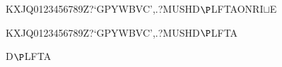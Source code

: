 \documentclass[12pt]{article}
\begin{document}
\begin{tt}
\begin{small}
\begin{bundle}{}
{\begin{bundle}{KXJQ0123456789Z?`GPYWBVC',.?MUSHD$\P$LFTAONRI$\sqcup$E}
{\begin{bundle}{KXJQ0123456789Z?`GPYWBVC',.?MUSHD$\P$LFTA}
{\begin{bundle}{D$\P$LFTA}
\end{bundle}}
\end{bundle}}
\end{bundle}}
\end{bundle}
\end{small}
\end{tt}
\newpage%
\end{document}
